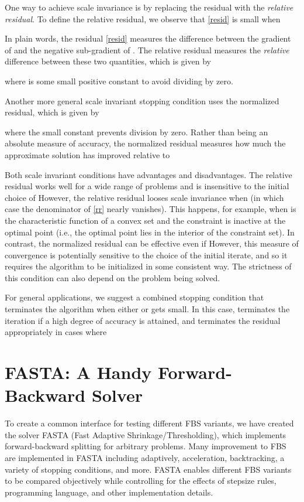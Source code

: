 \documentclass{amsart}
\newcommand{\eqn}[2]{}
\newcommand{\kp}{^{k+1}}
\theoremstyle{definition}
\begin{document}
One way to achieve scale invariance is by replacing the residual with the {\em relative residual}. To define the relative residual, we observe that \eqref{resid} is small when
  \eqn{relmatch}{ \nabla f(x\kp)\approx - \frac{ \hat x^{k+1}-x\kp}{\tau^k}.}
In plain words, the residual \eqref{resid} measures the difference between the gradient of  and the negative sub-gradient of . The relative residual  measures the {\em relative} difference between these two quantities, which is given by
\eqn{rr}{ r\kp_r =  \frac{ \| \nabla f(x\kp)+\frac{ \hat x^{k+1}-x\kp}{\tau^k}   \| }{ \max\{
\|\nabla f(x\kp)\|,
\|\frac{ \hat x^{k+1}-x\kp}{\tau^k}\|
 \}+\epsilon_r}
 =  \frac{ \| r\kp\|   }{ \max\{
\|\nabla f(x\kp)\|,
\|\frac{ \hat x^{k+1}-x\kp}{\tau^k}
 \|\}+\epsilon_r}   }
where  is some small positive constant to avoid dividing by zero.

Another more general scale invariant stopping condition uses the normalized residual, which is given by 
\eqn{rn}{r\kp_n = \frac{\|r\kp\|}{\|r^1\|+\epsilon_n}}
where the small constant   prevents division by zero. Rather than being an absolute measure of accuracy, the normalized residual measures how much the approximate solution has improved relative to 

Both scale invariant conditions have advantages and disadvantages.  The relative residual works well for a wide range of problems and is insensitive to the initial choice of   However, the relative residual looses scale invariance when  (in which case the denominator of \eqref{rr} nearly vanishes).  This happens, for example, when  is the characteristic function of a convex set and the constraint is inactive at the optimal point (i.e., the optimal point lies in the interior of the constraint set).  In contrast, the normalized residual can be effective even if   However, this measure of convergence is potentially sensitive to the choice of the initial iterate, and so it requires the algorithm to be initialized in some consistent way.  The strictness of this condition can also depend on the problem being solved.

For general applications, we suggest a combined stopping condition that terminates the algorithm when either  or   gets small.  In this case,  terminates the iteration if a high degree of accuracy is attained, and  terminates the residual appropriately in cases where 



\section{FASTA:  A Handy Forward-Backward Solver}
To create a common interface for testing different FBS variants, we have created the solver FASTA (Fast Adaptive Shrinkage/Thresholding), which implements forward-backward splitting for arbitrary problems. Many improvement to FBS are implemented in FASTA including adaptively, acceleration, backtracking, a variety of stopping conditions, and more.  FASTA enables different FBS variants to be compared objectively while controlling for the effects of stepsize rules, programming language, and other implementation details.  
\end{document}
